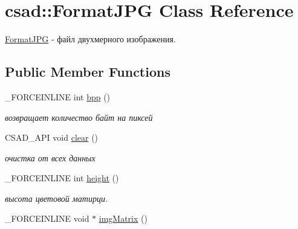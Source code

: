 \hypertarget{classcsad_1_1_format_j_p_g}{\section{csad\-:\-:Format\-J\-P\-G Class Reference}
\label{classcsad_1_1_format_j_p_g}
}


\hyperlink{classcsad_1_1_format_j_p_g}{Format\-J\-P\-G} -\/ файл двухмерного изображения.  


\subsection*{Public Member Functions}
\begin{DoxyCompactItemize}
\item 
\hypertarget{classcsad_1_1_format_j_p_g_ad79274615ffe7197681de1f7d74ab679}{\-\_\-\-F\-O\-R\-C\-E\-I\-N\-L\-I\-N\-E int \hyperlink{classcsad_1_1_format_j_p_g_ad79274615ffe7197681de1f7d74ab679}{bpp} ()}\label{classcsad_1_1_format_j_p_g_ad79274615ffe7197681de1f7d74ab679}

\begin{DoxyCompactList}\small\item\em возвращает количество байт на пиксей \end{DoxyCompactList}\item 
\hypertarget{classcsad_1_1_format_j_p_g_a4c805cd9aa25a3356d45e0844a1eeadd}{C\-S\-A\-D\-\_\-\-A\-P\-I void \hyperlink{classcsad_1_1_format_j_p_g_a4c805cd9aa25a3356d45e0844a1eeadd}{clear} ()}\label{classcsad_1_1_format_j_p_g_a4c805cd9aa25a3356d45e0844a1eeadd}

\begin{DoxyCompactList}\small\item\em очистка от всех данных \end{DoxyCompactList}\item 
\hypertarget{classcsad_1_1_format_j_p_g_a126275f7c14f4a00733b19aace6338d0}{\-\_\-\-F\-O\-R\-C\-E\-I\-N\-L\-I\-N\-E int \hyperlink{classcsad_1_1_format_j_p_g_a126275f7c14f4a00733b19aace6338d0}{height} ()}\label{classcsad_1_1_format_j_p_g_a126275f7c14f4a00733b19aace6338d0}

\begin{DoxyCompactList}\small\item\em высота цветовой матирци. \end{DoxyCompactList}\item 
\hypertarget{classcsad_1_1_format_j_p_g_a824d4ca3a31fc557b463a5781c560496}{\-\_\-\-F\-O\-R\-C\-E\-I\-N\-L\-I\-N\-E void $\ast$ \hyperlink{classcsad_1_1_format_j_p_g_a824d4ca3a31fc557b463a5781c560496}{img\-Matrix} ()}\label{classcsad_1_1_format_j_p_g_a824d4ca3a31fc557b463a5781c560496}


\end{DoxyCompactItemize}
